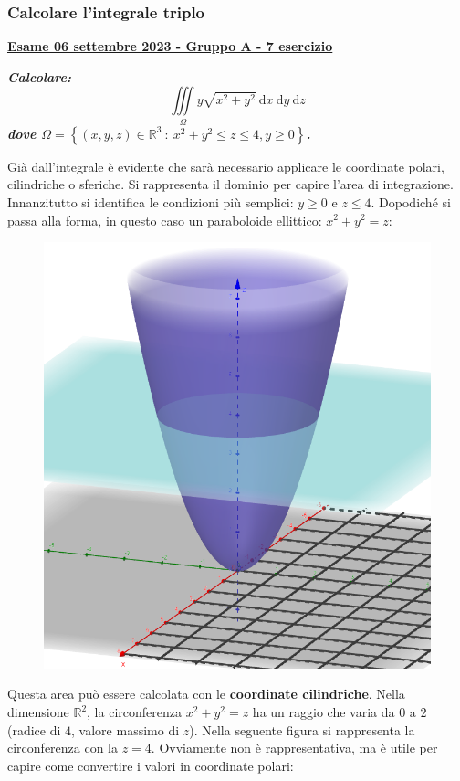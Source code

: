 \documentclass[a4paper]{article}
\newcommand{\definition}[1]{\textcolor{Red3}{\textbf{#1}}}
\newcommand{\example}[1]{\textcolor{Green4}{\textbf{#1}}}
\begin{document}
	\newpage

	\subsubsection{Calcolare l'integrale triplo}
	\begin{flushleft}
		\label{exam: esame 06 settembre 2023 - Gruppo A - 7 esercizio}
		\hypertarget{
			exam: esame 06 settembre 2023 - Gruppo A - 7 esercizio
		}{
			\definition{\underline{Esame 06 settembre 2023 - Gruppo A - 7 esercizio}}
		}
	\end{flushleft}
	\example{\emph{Calcolare:}
	\begin{equation*}
		\displaystyle\iiint\limits_{\Omega} y\sqrt{x^{2}+y^{2}} \:\mathrm{d}x\:\mathrm{d}y\:\mathrm{d}z
	\end{equation*}
	\emph{dove $\Omega = \left\{\left(x,y,z\right) \in \mathbb{R}^{3} \: : \: x^{2}+y^{2} \le z \le 4, y \ge 0\right\}$.}}\newline

	\noindent
	Già dall'integrale è evidente che sarà necessario applicare le coordinate polari, cilindriche o sferiche. Si rappresenta il dominio per capire l'area di integrazione. Innanzitutto si identifica le condizioni più semplici: $y \ge 0$ e $z \le 4$. Dopodiché si passa alla forma, in questo caso un paraboloide ellittico: $x^{2}+y^{2} = z$:
	\begin{figure}[!htp]
		\centering
		\includegraphics[width=.6\textwidth]{img/exercise/2023-09-06-A-ex7.png}
	\end{figure}

	\noindent
	Questa area può essere calcolata con le \textbf{coordinate cilindriche}. Nella dimensione $\mathbb{R}^{2}$, la circonferenza $x^{2}+y^{2}=z$ ha un raggio che varia da $0$ a $2$ (radice di $4$, valore massimo di $z$). Nella seguente figura si rappresenta la circonferenza con la $z=4$. Ovviamente non è rappresentativa, ma è utile per capire come convertire i valori in coordinate polari:\newpage
\end{document}
